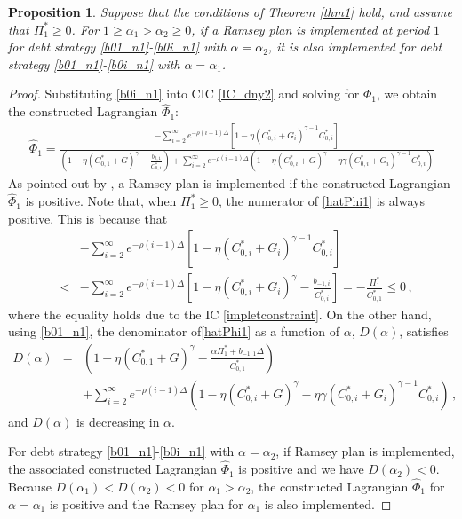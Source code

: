 \documentclass[12pt]{article}
\newtheorem{proposition}{Proposition}
\begin{document}
\begin{proposition}
Suppose that the conditions of Theorem \ref{thm1} hold, and assume that $\Pi_1^*\geq 0$.
For $1\geq \alpha_1>\alpha_2\geq 0$, if a Ramsey plan is implemented at period $1$ for debt strategy \eqref{b01_n1}-\eqref{b0i_n1} with $\alpha=\alpha_2$, it is also implemented for debt strategy \eqref{b01_n1}-\eqref{b0i_n1} with $\alpha=\alpha_1$.
\end{proposition}

\begin{proof}
	Substituting \eqref{b0i_n1} into  CIC \eqref{IC_dny2} and solving for $\Phi_1$, we obtain the constructed Lagrangian $\widehat{\Phi}_1$:
	\begin{align}\label{hatPhi1}
	\widehat{\Phi}_1 = \frac{  - \sum_{i=2}^\infty e^{-\rho (i-1)\Delta}\left[ 1-\eta \left( C_{0, i}^* + G_i  \right)^{\gamma-1}C_{0, i}^*\right]      }{ \left(1-\eta(C_{0, 1}^*+G)^\gamma-\frac{b_{0, 1}}{C_{0, 1}^*}\right)+\sum_{i=2}^\infty e^{-\rho (i-1)\Delta}\left( 1-\eta(C_{0, i}^*+G)^\gamma  -\eta \gamma \left( C_{0, i}^* + G_i  \right)^{\gamma-1}C_{0, i}^*  \right)   }
	\end{align}
As pointed out by \cite{debortoli2021optimal}, a Ramsey plan is implemented if the constructed Lagrangian  $\widehat{\Phi}_1$ is positive. 
Note that, when $\Pi_1^*\geq 0$, the numerator of \eqref{hatPhi1} is always positive. This is because that
\begin{eqnarray*}
& & - \sum_{i=2}^\infty e^{-\rho (i-1)\Delta}\left[ 1-\eta \left( C_{0, i}^* + G_i  \right)^{\gamma-1}C_{0, i}^*\right] \\
& <  &  - \sum_{i=2}^\infty e^{-\rho (i-1)\Delta}\left[ 1-\eta \left( C_{0, i}^* + G_i  \right)^{\gamma}-\frac{b_{-1, i}}{C_{0, i}^*}\right] =- \frac{\Pi_1^*}{C_{0, 1}^*}\leq 0 \,,
\end{eqnarray*}
where the equality holds due to the IC \eqref{impletconstraint}. On the other hand, using \eqref{b01_n1}, the denominator of\eqref{hatPhi1} as a function of $\alpha$, $D(\alpha)$, satisfies
	\begin{eqnarray*}
D(\alpha)  & = &   \left(1-\eta(C_{0, 1}^*+G)^\gamma-\frac{\alpha \Pi_1^*+b_{-1, 1}\Delta}{C_{0, 1}^*}\right) \\
	& & +\sum_{i=2}^\infty e^{-\rho (i-1)\Delta}\left( 1-\eta(C_{0, i}^*+G)^\gamma  -\eta \gamma \left( C_{0, i}^* + G_i  \right)^{\gamma-1}C_{0, i}^*  \right)   \,,
\end{eqnarray*}
and $D(\alpha)$ is decreasing in $\alpha$. 

For debt strategy \eqref{b01_n1}-\eqref{b0i_n1} with $\alpha=\alpha_2$, if Ramsey plan is implemented, the associated constructed Lagrangian $\widehat\Phi_1$ is positive and we have $D(\alpha_2)<0$. Because $D(\alpha_1)<D(\alpha_2)<0$ for $\alpha_1>\alpha_2$, the constructed Lagrangian $\widehat \Phi_1$ for $\alpha=\alpha_1$ is positive and the Ramsey plan for $\alpha_1$ is also implemented. 
\end{proof}
\end{document}
